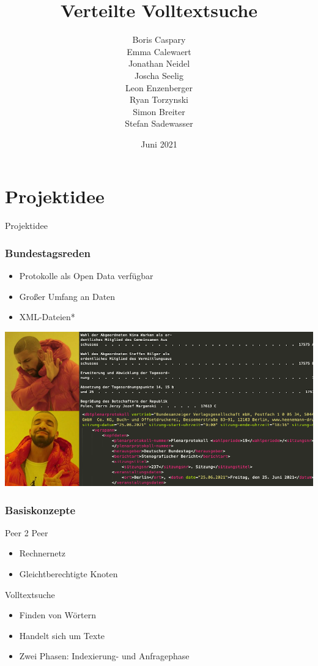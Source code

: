 \documentclass{beamer}
\title{Verteilte Volltextsuche}
\subtitle{}
\author{
  Boris Caspary \\
  Emma Calewaert \\
  Jonathan Neidel \\
  Joscha Seelig \\
  Leon Enzenberger \\
  Ryan Torzynski \\
  Simon Breiter \\
  Stefan Sadewasser \\
}
\date{Juni 2021}
\institute{HTW Berlin, Angewandte Informatik, Projektstudium bei Herr Hoppe}
\begin{document}
\frame{\titlepage}

\section{Projektidee}
\begin{frame}
  \begin{center}
    {\Huge Projektidee}
  \end{center}
\end{frame}

\begin{frame}
  \frametitle{Bundestagsreden}
  \begin{itemize}
    \item Protokolle als Open Data verfügbar
    \item Großer Umfang an Daten
    \item XML-Dateien*
  \end{itemize}
\end{frame}

\begin{frame}
    \hspace*{-10.75mm}
    \includegraphics[width=\paperwidth]{drakememe}
\end{frame}

\begin{frame}[allowframebreaks]
  \frametitle{Basiskonzepte}
  Peer 2 Peer
  \begin{itemize}
    \item Rechnernetz
    \item Gleichtberechtigte Knoten
  \end{itemize}

  \break
  Volltextsuche
    \begin{itemize}
    \item Finden von Wörtern
    \item Handelt sich um Texte
    \item Zwei Phasen: Indexierung- und Anfragephase
  \end{itemize}
\end{frame}
\end{document}
